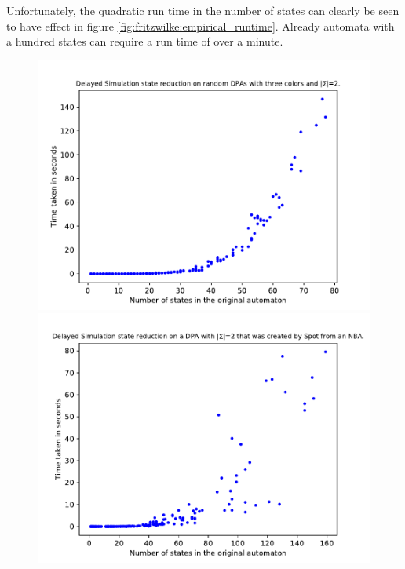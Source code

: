 Unfortunately, the quadratic run time in the number of states can clearly be seen to have effect in figure \ref{fig:fritzwilke:empirical_runtime}. Already automata with a hundred states can require a run time of over a minute.

\begin{figure}
	\centering
	\begin{minipage}{0.49\textwidth}
		\includegraphics[page=6,height=.3\textheight]{../data/analysis/fritzwilke/gendet_ap1.pdf} 
		\includegraphics[page=6,height=.3\textheight]{../data/analysis/fritzwilke/detspot_ap1.pdf} 

\end{minipage}
\end{figure}
